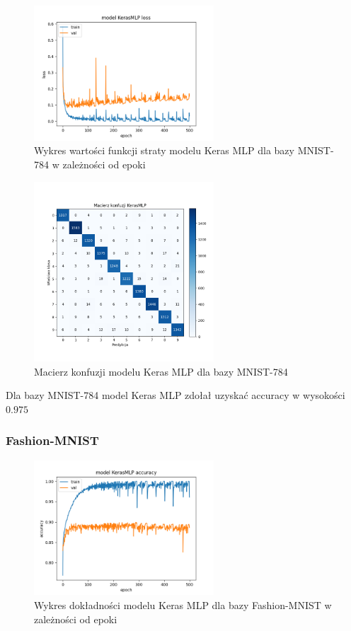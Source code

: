 \documentclass{article}
\begin{document}
\begin{figure}[H]
    \centering
    \includegraphics[width=0.6\textwidth]{../Saves/KerasMLP/mnist-784/KerasMLP_mnist_784_ep500_loss.png}
    \caption{Wykres wartości funkcji straty modelu Keras MLP dla bazy MNIST-784 w zależności od epoki} 
\end{figure}

\begin{figure}[H]
	\centering
	\includegraphics[width=0.6\textwidth]{../Saves/KerasMLP/mnist-784/KerasMLP_mnist_784_conf_mat.png}
	\caption{Macierz konfuzji modelu Keras MLP dla bazy MNIST-784}
\end{figure}
Dla bazy MNIST-784 model Keras MLP zdołał uzyskać accuracy w wysokości $0.975$

\subsubsection{Fashion-MNIST}
\begin{figure}[H]
    \centering
    \includegraphics[width=0.6\textwidth]{../Saves/KerasMLP/fashion-mnist/KerasMLP_fashion-mnist_ep500_acc.png}
    \caption{Wykres dokładności modelu Keras MLP dla bazy Fashion-MNIST w zależności od epoki}
\end{figure}
\end{document}
